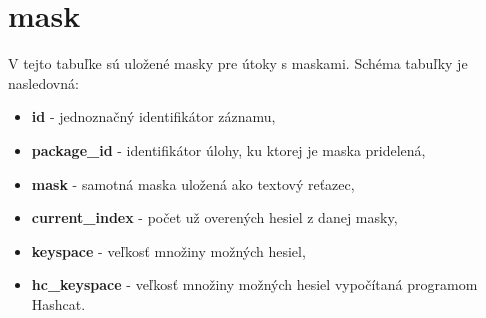 \documentclass[zadani,slovak]{fitthesis}
\begin{document}
\section{mask} \label{fcMask}
V tejto tabuľke sú uložené masky pre útoky s maskami. Schéma tabuľky je nasledovná:
\begin{itemize}
    \item \textbf{id} - jednoznačný identifikátor záznamu,
    \item \textbf{package\_id} - identifikátor úlohy, ku ktorej je maska pridelená,
    \item \textbf{mask} - samotná maska uložená ako textový reťazec,
    \item \textbf{current\_index} - počet už overených hesiel z danej masky,
    \item \textbf{keyspace} - veľkosť množiny možných hesiel,
    \item \textbf{hc\_keyspace} - veľkosť množiny možných hesiel vypočítaná programom Hashcat.
\end{itemize}
\end{document}
